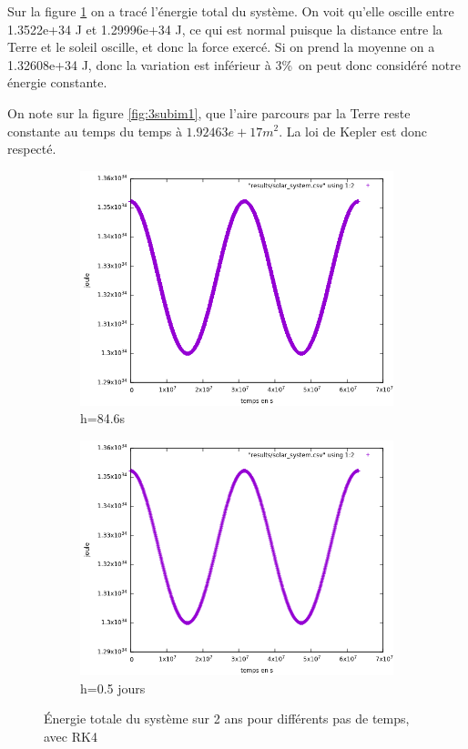 \documentclass[11pt]{article}
\begin{document}
Sur la figure \ref{fig:2subim1} on a tracé l'énergie total du système. On voit qu'elle oscille entre 1.3522e+34 J et 1.29996e+34 J, ce qui est normal puisque la distance entre la Terre et le soleil oscille, et donc la force exercé. Si on prend la moyenne on a 1.32608e+34 J, donc la variation est inférieur à 3\%\ on peut donc considéré notre énergie constante.

On note sur la figure \ref{fig:3subim1}, que l'aire parcours par la Terre reste constante au temps du temps à \(1.92463e+17 m^2\). La loi de Kepler est donc respecté.



\begin{figure}[H]
\begin{subfigure}{0.5\textwidth}
\includegraphics[width=1\linewidth]{modelisations/h=60s/energy_system.png}
\caption{h=84.6s}
\label{fig:2subim1}
\end{subfigure}
\begin{subfigure}{0.5\textwidth}
\includegraphics[width=1\linewidth]{modelisations/h=0.5j/energy_syst_0.5.png}
\caption{h=0.5 jours}
\label{fig:2subim2}
\end{subfigure}
\caption{Énergie totale du système sur 2 ans pour différents pas de temps, avec RK4}
\label{fig:image2}
\end{figure}
\end{document}
